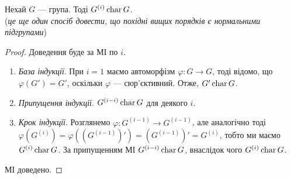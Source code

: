 \documentclass{math_library}
\begin{document}
\begin{proposition}
Нехай $G$ --- група. Тоді $G^{(i)} \operatorname{char} G$.\\
(\textit{це ще один спосіб довести, що похідні вищих порядків є нормальними підгрупами})
\end{proposition}

\begin{proof}
Доведення буде за МІ по $i$.
\begin{enumerate}[wide=0pt,nosep,label={\Roman*.}]
\item \textit{База індукції}. При $i = 1$ маємо автоморфізм $\varphi \colon G \to G$, тоді відомо, що $\varphi(G') = G'$, оскільки $\varphi$ --- сюр'єктивний. Отже, $G' \operatorname{char} G$.
\item \textit{Припущення індукції}. $G^{(i-i)} \operatorname{char} G$ для деякого $i$.
\item \textit{Крок індукції}. Розглянемо $\varphi \colon G^{(i-1)} \to G^{(i-1)}$, але аналогічно тоді $\varphi(G^{(i)}) = \varphi((G^{(i-1)})') = (G^{(i-1)})' = G^{(i)}$, тобто ми маємо $G^{(i)} \operatorname{char} G$. За припущенням МІ $G^{(i-i)} \operatorname{char} G$, внаслідок чого $G^{(i)} \operatorname{char} G$.
\end{enumerate}
МІ доведено.
\end{proof}

\end{document}
